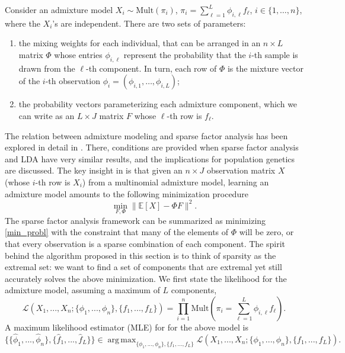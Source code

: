 \documentclass[12pt, reqno]{amsart}
\theoremstyle{definition}
\DeclareMathOperator*{\argmax}{arg\,max}
\begin{document}
Consider an admixture model $X_i \sim \text{Mult}(\pi_i)$, $\pi_i = \sum_{\ell=1}^L \phi_{i,\ell} f_\ell$, $i\in\{1,\ldots,n\}$, where the $X_i$'s are independent. There are two sets of parameters: 
\begin{enumerate}
\item the mixing weights for each individual, that can be arranged in an $n\times L$ matrix $\Phi$ whose entries $\phi_{i,\ell}$ represent the probability that the
$i$-th sample is drawn from the $\ell$-th component. In turn, each row of $\Phi$ is the mixture vector of the $i$-th observation $\phi_i = (\phi_{i,1},\ldots,\phi_{i,L})$;
\item the probability vectors parameterizing each admixture component, which we can write as an $L\times J$ matrix $F$ whose $\ell$-th row is $f_\ell$.
\end{enumerate}
The relation between admixture modeling and sparse factor analysis has been  
explored in detail in \cite{engel}. There, conditions are provided when sparse factor analysis and LDA have very similar results, and the implications for population genetics are discussed. The key insight in \cite{engel} is that given an $n\times J$ observation matrix $X$ (whose $i$-th row is $X_i$) from a multinomial admixture model, learning an admixture model amounts to the following minimization procedure
\begin{equation}\label{min_probl}
\min_{F,\Phi}\| \mathbb{E}[X] -  \Phi F\|^2.
\end{equation}
The sparse factor analysis framework can be summarized as minimizing \eqref{min_probl} with the constraint that many of the elements of $\Phi$ will be zero, or that every observation is a sparse combination of each component. The spirit behind the algorithm proposed in this section is to think of sparsity as the extremal set: we want to find a set of components that are extremal yet still accurately solves the above minimization. We first state the likelihood for the admixture model, assuming a maximum of $L$ components,
$$\mathcal{L}(X_1,...,X_n; \{\phi_1,...,\phi_n\}, \{f_1,...,f_L\}) = \prod_{i=1}^n \mbox{Mult}\left(\pi_i =  \sum_{\ell=1}^L \phi_{i,\ell} f_\ell  \right).$$
A maximum likelihood estimator (MLE) for for the above model is
\begin{equation}
\label{mixtureml}
 \{\{\hat{\phi}_1,...,\hat{\phi}_n\}, \{\hat{f}_1,...,\hat{f}_L\}\} \in \argmax_{\{\phi_1,...,\phi_n\}, \{f_1,...,f_L\}}  \mathcal{L}(X_1,...,X_n; \{\phi_1,...,\phi_n\}, \{f_1,...,f_L\}).
 \end{equation}
\end{document}
